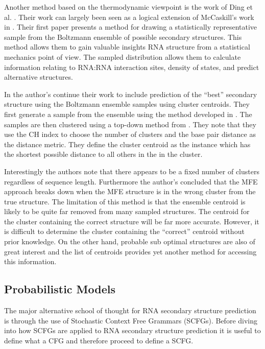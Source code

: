 \documentclass[journal]{IEEEtran}
\begin{document}
Another method based on the thermodynamic viewpoint is the work of Ding et al. \cite{ding2003statistical, ding2005rna}. Their work can largely been seen as a logical extension of McCaskill's work in \cite{mccaskill1990equilibrium}. Their first paper \cite{ding2003statistical} presents a method for drawing a statistically representative sample from the Boltzmann ensemble of possible secondary structures. This method allows them to gain valuable insights RNA structure from a statistical mechanics point of view. The sampled distribution allows them to calculate information relating to RNA:RNA interaction sites, density of states, and predict alternative structures.

In \cite{ding2005rna} the author's continue their work to include prediction of the ``best'' secondary structure using the Boltzmann ensemble samples using cluster centroids. They first generate a sample from the ensemble using the method developed in \cite{ding2003statistical}. The samples are then clustered using a top-down method from \cite{rousseeuw1990finding}. They note that they use the CH index to choose the number of clusters and the base pair distance as the distance metric. They define the cluster centroid as the instance which has the shortest possible distance to all others in the in the cluster.

Interestingly the authors note that there appears to be a fixed number of clusters regardless of sequence length. Furthermore the author's concluded that the MFE approach breaks down when the MFE structure is in the wrong cluster from the true structure. The limitation of this method is that the ensemble centroid is likely to be quite far removed from many sampled structures. The centroid for the cluster containing the correct structure will be far more accurate. However, it is difficult to determine the cluster containing the ``correct'' centroid without prior knowledge. On the other hand, probable sub optimal structures are also of great interest and the list of centroids provides yet another method for accessing this information.


\subsection{Probabilistic Models}
\label{subsec:probalistic-models}
The major alternative school of thought for RNA secondary structure prediction is through the use of Stochastic Context Free Grammars (SCFGs). Before diving into how SCFGs are applied to RNA secondary structure prediction it is useful to define what a CFG and therefore proceed to define a SCFG. 
\end{document}
